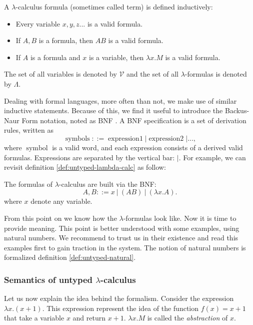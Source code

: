 \begin{definition}\label{def:untyped-lambda-calc}
  A $\lambda$-calculus formula (sometimes called term) is defined inductively:
  \begin{itemize}
  \item Every variable $x,y,z...$ is a valid formula.
  \item If $A,B$ is a formula, then $AB$ is a valid formula.
  \item If $A$ is a formula and $x$ is a variable, then $\lambda x.M$ is a valid formula.
  \end{itemize}
  The set of all variables is denoted by $\mathcal{V}$ and the set of all $\lambda$-formulas is denoted by $\Lambda$.\\
\end{definition}


Dealing with formal languages, more often than not, we make use of similar inductive statements. Because of this, we find it useful to introduce the Backus-Naur Form notation, noted as BNF \cite{knuth1964backus}.  A BNF specification is a set of derivation rules, written as $$\operatorname{symbols} ::= \operatorname{expression1} | \operatorname{expression2} |...,$$ where $\operatorname{symbol}$ is a valid word, and each  expression consists of a derived valid formulas. Expressions are separated by the vertical bar: $|$. For example, we can revisit definition \ref{def:untyped-lambda-calc} as follow:

\begin{definition}
  The formulas of  $\lambda$-calculus are built via the BNF:
  $$A,B ::= x\ |\ (AB)\ |\ (\lambda x.A) .$$
  where $x$ denote any variable.
\end{definition}


From this point on we know how the $\lambda$-formulas look like. Now it is time to provide meaning. This point is better understood with some examples, using natural numbers.  We recommend to trust us in their existence and read this examples first to gain traction in the system. The notion of natural numbers is formalized definition \ref{def:untyped-natural}.\\


\subsubsection{Semantics of untyped $\lambda$-calculus}
Let us now explain the idea behind the formalism. Consider the expression $\lambda x.(x+1)$. This expression represent the idea of the function $f(x)=x+1$ that take a variable $x$ and return $x+1$. $\lambda x.M$ is called the \emph{abstraction} of $x$.\\

